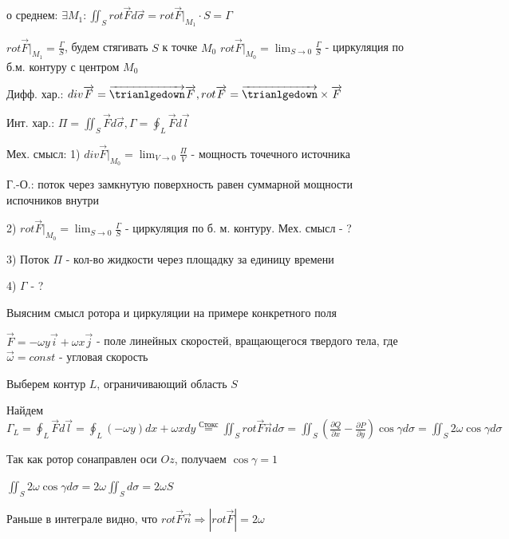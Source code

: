 \documentclass[12pt]{article}
\begin{document}
    \Ths о среднем: $\exists M_1 : \iint_S rot \overrightarrow{F} d\overrightarrow{\sigma} = rot \overrightarrow{F} \Big|_{M_1} \cdot S = \Gamma$

    $rot \overrightarrow{F} \Big|_{M_1} = \frac{\Gamma}{S}$, будем стягивать $S$ к точке $M_0$ \Longrightarrow $rot \overrightarrow{F} \Big|_{M_0} = \lim_{S \to 0} \frac{\Gamma}{S}$ - циркуляция по б.м. контуру с центром $M_0$



    \Mem Дифф. хар.: $div \overrightarrow{F} = \overrightarrow{\trianlgedown} \overrightarrow{F}, rot \overrightarrow{F} = \overrightarrow{\trianlgedown} \times \overrightarrow{F}$

    Инт. хар.: $\Pi = \iint_S \overrightarrow{F} d\overrightarrow{\sigma}, \Gamma = \oint_L \overrightarrow{F} d\overrightarrow{l}$

    Мех. смысл: 1) $div \overrightarrow{F} \Big|_{M_0} = \lim_{V \to 0} \frac{\Pi}{V}$ - мощность точечного источника

    Г.-О.: поток через замкнутую поверхность равен суммарной мощности испочников внутри

    2) $rot \overrightarrow{F} \Big|_{M_0} = \lim_{S \to 0} \frac{\Gamma}{S}$ - циркуляция по б. м. контуру. Мех. смысл - ?

    3) Поток $\Pi$ - кол-во жидкости через площадку за единицу времени

    4) $\Gamma$ - ?

    \Nota Выясним смысл ротора и циркуляции на примере конкретного поля

    \Ex $\overrightarrow{F} = -\omega y \overrightarrow{i} + \omega x \overrightarrow{j}$ - поле линейных скоростей, вращающегося твердого тела, где $\overrightarrow{\omega} = const$ - угловая скорость

    Выберем контур $L$, ограничивающий область $S$

    Найдем $\Gamma_L = \oint_L \overrightarrow{F}d\overrightarrow{l} = \oint_L (-\omega y) dx + \omega x dy \stackrel{\text{Стокс}}{=}
    \iint_S rot \overrightarrow{F} \overrightarrow{n} d\sigma = \iint_S (\frac{\partial Q}{\partial x} - \frac{\partial P}{\partial y})\cos \gamma d\sigma =
    \iint_S 2\omega \cos \gamma d\sigma$

    Так как ротор сонаправлен оси $Oz$, получаем $\cos \gamma = 1$

    $\iint_S 2\omega \cos \gamma d\sigma = 2\omega \iint_S d\sigma = 2\omega S$

    Раньше в интеграле видно, что $rot \overrightarrow{F} \overrightarrow{n} \Longrightarrow |rot \overrightarrow{F}| = 2\omega$
\end{document}
